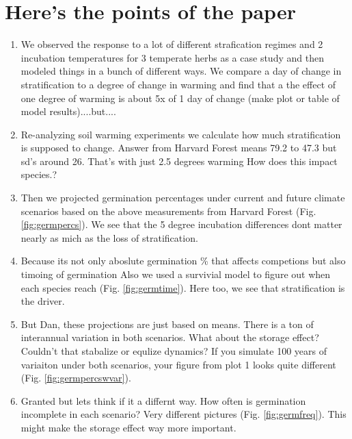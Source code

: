 \documentclass[11pt]{article}
\begin{document}
\section*{Here's the points of the paper}
\begin{enumerate}
\item We observed the response to a lot of different strafication regimes and 2 incubation temperatures for 3 temperate herbs as a case study and then modeled things in a bunch of different ways. We compare a day of change in stratification to a degree of change in warming and find that a the effect of one degree of warming is about 5x of 1 day of change (make plot or table of model results)....but....
\item  Re-analyzing soil warming experiments we calculate how much stratification is supposed to change. Answer from Harvard Forest means 79.2 to 47.3 but sd's around 26. That's with just 2.5 degrees warming How does this impact species.?

\item Then we projected germination percentages under current and future climate scenarios based on the above measurements from Harvard Forest (Fig. \ref{fig:germpercs}). We see that the 5 degree incubation differences dont matter nearly as mich as the loss of stratification.

\item Because its not only aboslute germination \% that affects competions but also timoing of germination Also we used a survivial model to figure out when each species reach (Fig. \ref{fig:germtime}). Here too, we see that stratification is the driver.

\item But Dan, these projections are just based on means. There is a ton of interannual variation in both scenarios. What about the storage effect? Couldn't that stabalize or equlize dynamics? If you simulate 100 years of variaiton under both scenarios, your figure from plot 1 looks quite different (Fig. \ref{fig:germpercswvar}).
    
    \item Granted but lets think if it a differnt way. How often is germination incomplete in each scenario? Very different pictures (Fig. \ref{fig:germfreq}). This might make the storage effect way more important.
    \end{enumerate}
    
\end{document}
